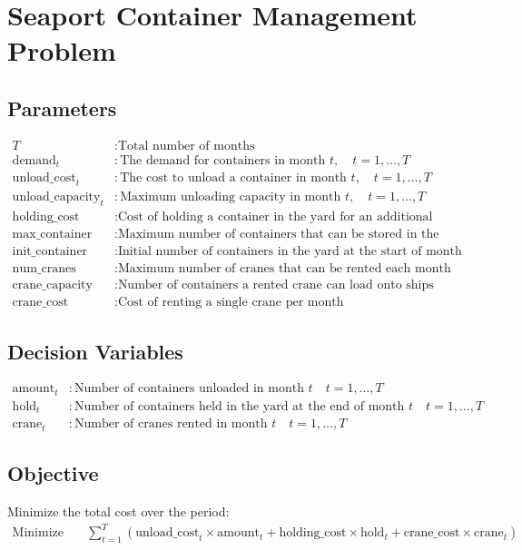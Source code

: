 \documentclass{article}
\begin{document}
\section*{Seaport Container Management Problem}

\subsection*{Parameters}
\begin{align*}
    T & : \text{Total number of months} \\
    \text{demand}_t & : \text{The demand for containers in month } t, \quad t = 1, \ldots, T \\
    \text{unload\_cost}_t & : \text{The cost to unload a container in month } t, \quad t = 1, \ldots, T \\
    \text{unload\_capacity}_t & : \text{Maximum unloading capacity in month } t, \quad t = 1, \ldots, T \\
    \text{holding\_cost} & : \text{Cost of holding a container in the yard for an additional month} \\
    \text{max\_container} & : \text{Maximum number of containers that can be stored in the yard} \\
    \text{init\_container} & : \text{Initial number of containers in the yard at the start of month 1} \\
    \text{num\_cranes} & : \text{Maximum number of cranes that can be rented each month} \\
    \text{crane\_capacity} & : \text{Number of containers a rented crane can load onto ships} \\
    \text{crane\_cost} & : \text{Cost of renting a single crane per month}
\end{align*}

\subsection*{Decision Variables}
\begin{align*}
    \text{amount}_t & : \text{Number of containers unloaded in month } t \quad t = 1, \ldots, T \\
    \text{hold}_t & : \text{Number of containers held in the yard at the end of month } t \quad t = 1, \ldots, T \\
    \text{crane}_t & : \text{Number of cranes rented in month } t \quad t = 1, \ldots, T
\end{align*}

\subsection*{Objective}
Minimize the total cost over the period:
\begin{align*}
    \text{Minimize} \quad & \sum_{t=1}^{T} \left( \text{unload\_cost}_t \times \text{amount}_t + \text{holding\_cost} \times \text{hold}_t + \text{crane\_cost} \times \text{crane}_t \right)
\end{align*}
\end{document}
